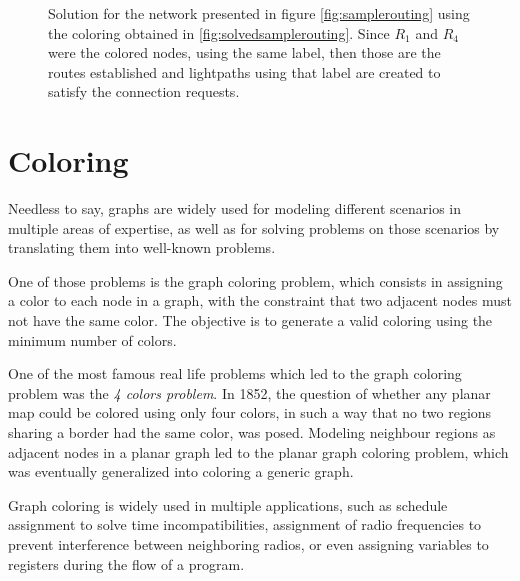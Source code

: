 {\begin{figure}[h]
		
		\caption{Solution for the network presented in figure \ref{fig:samplerouting} using the coloring obtained in \ref{fig:solvedsamplerouting}. Since $R_1$ and $R_4$ were the colored nodes, using the same label, then those are the routes established and lightpaths using that label are created to satisfy the connection requests.}
		\label{fig:solvedsampleroutingnetwork}
	\end{figure}
}


\section{Coloring}

Needless to say, graphs are widely used for modeling different scenarios in multiple areas of expertise, as well as for solving problems on those scenarios by translating them into well-known problems. 

One of those problems is the graph coloring problem, which consists in assigning a color to each node in a graph, with the constraint that two adjacent nodes must not have the same color. The objective is to generate a valid coloring using the minimum number of colors.

One of the most famous real life problems which led to the graph coloring problem was the \textit{4 colors problem}. In 1852, the question of whether any planar map could be colored using only four colors, in such a way that no two regions sharing a border had the same color, was posed. Modeling neighbour regions as adjacent nodes in a planar graph led to the planar graph coloring problem, which was eventually generalized into coloring a generic graph.

Graph coloring is widely used in multiple applications, such as schedule assignment to solve time incompatibilities, assignment of radio frequencies to prevent interference between neighboring radios, or even assigning variables to registers during the flow of a program.

